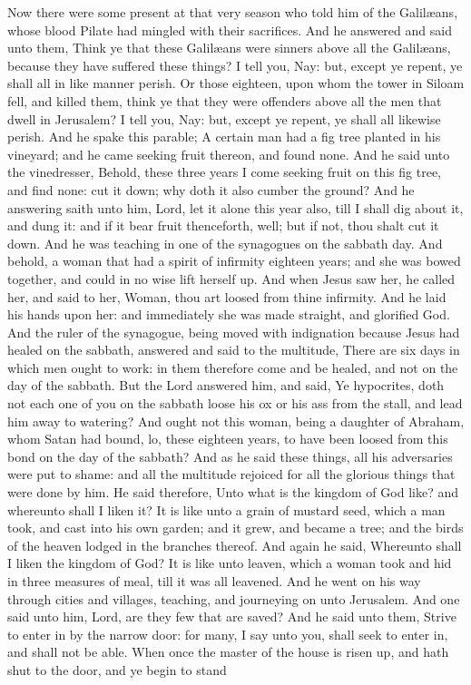 Now there were some present at that very season who told him of the Galilæans, whose blood Pilate had mingled with their sacrifices. And he answered and said unto them, Think ye that these Galilæans were sinners above all the Galilæans, because they have suffered these things? I tell you, Nay: but, except ye repent, ye shall all in like manner perish. Or those eighteen, upon whom the tower in Siloam fell, and killed them, think ye that they were offenders above all the men that dwell in Jerusalem? I tell you, Nay: but, except ye repent, ye shall all likewise perish.  And he spake this parable; A certain man had a fig tree planted in his vineyard; and he came seeking fruit thereon, and found none. And he said unto the vinedresser, Behold, these three years I come seeking fruit on this fig tree, and find none: cut it down; why doth it also cumber the ground? And he answering saith unto him, Lord, let it alone this year also, till I shall dig about it, and dung it: and if it bear fruit thenceforth, well; but if not, thou shalt cut it down.  And he was teaching in one of the synagogues on the sabbath day. And behold, a woman that had a spirit of infirmity eighteen years; and she was bowed together, and could in no wise lift herself up. And when Jesus saw her, he called her, and said to her, Woman, thou art loosed from thine infirmity. And he laid his hands upon her: and immediately she was made straight, and glorified God. And the ruler of the synagogue, being moved with indignation because Jesus had healed on the sabbath, answered and said to the multitude, There are six days in which men ought to work: in them therefore come and be healed, and not on the day of the sabbath. But the Lord answered him, and said, Ye hypocrites, doth not each one of you on the sabbath loose his ox or his ass from the stall, and lead him away to watering? And ought not this woman, being a daughter of Abraham, whom Satan had bound, lo, these eighteen years, to have been loosed from this bond on the day of the sabbath? And as he said these things, all his adversaries were put to shame: and all the multitude rejoiced for all the glorious things that were done by him.  He said therefore, Unto what is the kingdom of God like? and whereunto shall I liken it? It is like unto a grain of mustard seed, which a man took, and cast into his own garden; and it grew, and became a tree; and the birds of the heaven lodged in the branches thereof.  And again he said, Whereunto shall I liken the kingdom of God? It is like unto leaven, which a woman took and hid in three measures of meal, till it was all leavened.  And he went on his way through cities and villages, teaching, and journeying on unto Jerusalem. And one said unto him, Lord, are they few that are saved? And he said unto them, Strive to enter in by the narrow door: for many, I say unto you, shall seek to enter in, and shall not be able. When once the master of the house is risen up, and hath shut to the door, and ye begin to stand 